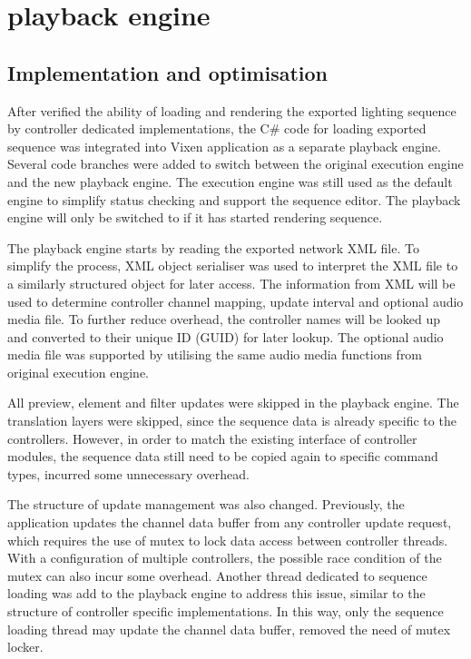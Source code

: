 \chapter{playback engine}
\renewcommand{\baselinestretch}{\mystretch}
\label{chap:Playback}

\section{Implementation and optimisation}

After verified the ability of loading and rendering the exported lighting sequence by controller dedicated implementations, the C\# code for loading exported sequence was integrated into Vixen application as a separate playback engine. Several code branches were added to switch between the original execution engine and the new playback engine. The execution engine was still used as the default engine to simplify status checking and support the sequence editor. The playback engine will only be switched to if it has started rendering sequence.

The playback engine starts by reading the exported network XML file. To simplify the process, XML object serialiser was used to interpret the XML file to a similarly structured object for later access. The information from XML will be used to determine controller channel mapping, update interval and optional audio media file. To further reduce overhead, the controller names will be looked up and converted to their unique ID (GUID) for later lookup. The optional audio media file was supported by utilising the same audio media functions from original execution engine.

All preview, element and filter updates were skipped in the playback engine. The translation layers were skipped, since the sequence data is already specific to the controllers. However, in order to match the existing interface of controller modules, the sequence data still need to be copied again to specific command types, incurred some unnecessary overhead.

The structure of update management was also changed. Previously, the application updates the channel data buffer from any controller update request, which requires the use of mutex to lock data access between controller threads. With a configuration of multiple controllers, the possible race condition of the mutex can also incur some overhead. Another thread dedicated to sequence loading was add to the playback engine to address this issue, similar to the structure of controller specific implementations. In this way, only the sequence loading thread may update the channel data buffer, removed the need of mutex locker.

